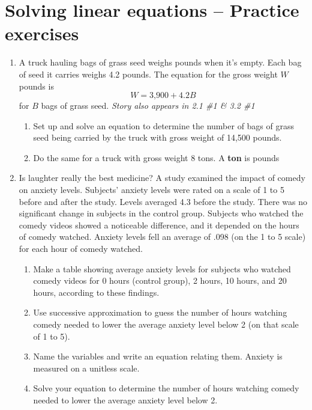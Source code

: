 \section{Solving linear equations -- Practice exercises}

\begin{enumerate}

\item A truck hauling bags of grass seed weighs  pounds when it's empty.  Each bag of seed it carries weighs 4.2 pounds.   The equation for the gross weight $W$ pounds is $$W = \text{3,900} + 4.2B$$ for $B$ bags of grass seed.  \hfill \emph{Story also appears in 2.1 \#1 \& 3.2 \#1}
\begin{enumerate} 
\item Set up and solve an equation to determine the number of bags of grass seed being carried by the truck with gross weight of 14,500 pounds. \vfill
\item Do the same for a truck with gross weight 8 tons. A \textbf{ton} is  pounds \vfill \vfill
\end{enumerate} 

\newpage %

\item Is laughter really the best medicine?  A study examined the impact of comedy on anxiety levels.  Subjects' anxiety levels were rated on a scale of 1 to 5 before and after the study.  Levels averaged 4.3 before the study.  There was no significant change in subjects in the control group.  Subjects who watched the comedy videos showed a noticeable difference, and it depended on the hours of comedy watched.  Anxiety levels fell an average of .098 (on the 1 to 5 scale) for each hour of comedy watched.
\begin{enumerate}
\item Make a table showing average anxiety levels for subjects who watched comedy videos for 0 hours (control group), 2 hours, 10 hours, and 20 hours, according to these findings.  \vfill
\item Use successive approximation to guess the number of hours watching comedy needed to lower the average anxiety level below 2 (on that scale of 1 to 5). \vfill
\item Name the variables and write an equation relating them.  Anxiety is measured on a unitless scale. \vfill
\item Solve your equation to determine the number of hours watching comedy needed to lower the average anxiety level below 2. \vfill
\end{enumerate}


\end{enumerate}
